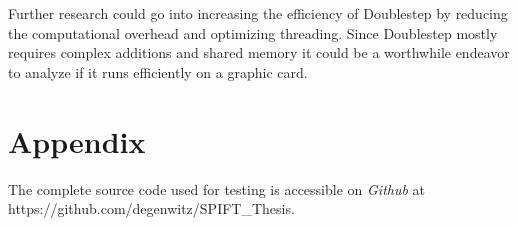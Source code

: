 \documentclass[12pt]{article}
\begin{document}
Further research could go into increasing the efficiency of Doublestep by reducing the computational overhead and optimizing threading. Since Doublestep mostly requires complex additions and shared memory it could be a worthwhile endeavor to analyze if it runs efficiently on a graphic card.  

\pagebreak



\pagebreak

\section{Appendix}

The complete source code used for testing is accessible on \emph{Github} at https://github.com/degenwitz/SPIFT\_Thesis.
\end{document}
